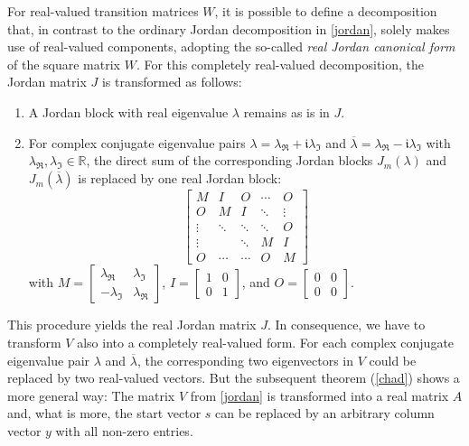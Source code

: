 \documentclass[preprint,12pt,times,authoryear]{elsarticle}%
\theoremstyle{definition}
\begin{document}
For real-valued transition matrices $W$, it is possible to define a
decomposition that, in contrast to the ordinary Jordan decomposition in
\cref{jordan}, solely makes use of real-valued components, adopting the
so-called \emph{real Jordan canonical form} \cite[Sect.~3.4.1]{HJ13} of the
square matrix $W$.
For this completely real-valued decomposition, the Jordan matrix $J$ is
transformed as follows:
\begin{enumerate}
  \item A Jordan block with real eigenvalue $\lambda$ remains as is in $J$.
  \item For complex conjugate eigenvalue pairs $\lambda = \lambda_\Re +
	\mathfrak{i}\lambda_\Im$ and $\overline{\lambda} = \lambda_\Re - \mathfrak{i}\lambda_\Im$
	with $\lambda_\Re,\lambda_\Im \in \mathbb{R}$, the
	direct sum of the corresponding Jordan blocks $J_m(\lambda)$ and
	$J_m(\overline{\lambda})$ is replaced by one real Jordan block:
	\[
	  \left[ \begin{array}{*{5}{c}}
		M & I & O & \cdots & O\\
		O & M & I & \ddots & \vdots\\
		\vdots & \ddots & \ddots & \ddots & O\\
		\vdots & & \ddots & M & I\\
		O & \cdots & \cdots & O & M
	  \end{array} \right]
	\]
	with
	  $M = \left[ \begin{array}{cc}
		\lambda_\Re & \lambda_\Im\\
		-\lambda_\Im & \lambda_\Re
	  \end{array} \right]$,
	  $I = \left[ \begin{array}{cc}
		1 & 0\\
		0 & 1
	  \end{array} \right]$, and
	  $O = \left[ \begin{array}{cc}
		0 & 0\\
		0 & 0
	  \end{array} \right]$.
\end{enumerate}

This procedure yields the real Jordan matrix $J$. In consequence, we have to
transform $V$ also into a completely real-valued form. For each complex
conjugate eigenvalue pair $\lambda$ and $\overline{\lambda}$, the corresponding
two eigenvectors in $V$ could be replaced by two real-valued vectors. But the
subsequent theorem (\cref{chad}) shows a more general way: The matrix $V$ from
\cref{jordan} is transformed into a real matrix $A$ and, what is more, the start
vector $s$ can be replaced by an arbitrary column vector $y$ with all non-zero
entries.
\end{document}
